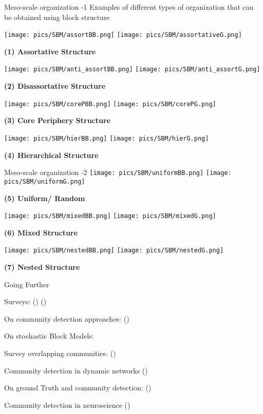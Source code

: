 \begin{textbox}{Meso-scale organization -1}
    Examples of different types of organization that can be obtained using block structure


    \centering

    \texttt{[image: pics/SBM/assortBB.png]}
    \texttt{[image: pics/SBM/assortativeG.png]}

    \textbf{(1) Assortative Structure}

    \texttt{[image: pics/SBM/anti\_assortBB.png]}
    \texttt{[image: pics/SBM/anti\_assortG.png]}

    \textbf{(2) Disassortative Structure
    }

    \texttt{[image: pics/SBM/corePBB.png]}
    \texttt{[image: pics/SBM/corePG.png]}

    \textbf{(3) Core Periphery Structure
    }

    \texttt{[image: pics/SBM/hierBB.png]}
    \texttt{[image: pics/SBM/hierG.png]}

    \textbf{(4) Hierarchical Structure
    }
\end{textbox}


\begin{textbox}{Meso-scale organization -2}
    \centering
    \texttt{[image: pics/SBM/uniformBB.png]}
    \texttt{[image: pics/SBM/uniformG.png]}

    \textbf{(5) Uniform/ Random}

    \texttt{[image: pics/SBM/mixedBB.png]}
    \texttt{[image: pics/SBM/mixedG.png]}

    \textbf{(6) Mixed Structure}

    \texttt{[image: pics/SBM/nestedBB.png]}
    \texttt{[image: pics/SBM/nestedG.png]}

    \textbf{(7) Nested Structure}
\end{textbox}


\begin{textbox}{Going Further}

    Surveys: (\cite{fortunato2010community}) (\cite{fortunato2016community})

    On community detection approaches: (\cite{rosvall2019different})

    On stochastic Block Models:\cite{funke2019stochastic}

    Survey overlapping communities: (\cite{xie2013overlapping})

    Community detection in dynamic networks (\cite{rossetti2018community})

    On ground Truth and community detection: (\cite{peel2017ground})

    Community detection in neuroscience (\cite{betzel2020community})
\end{textbox}
